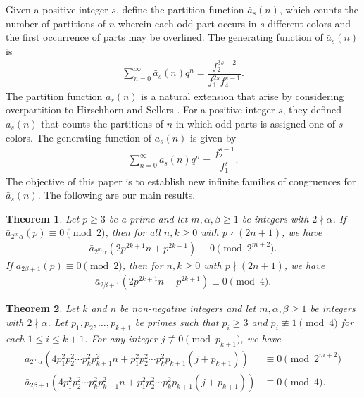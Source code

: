 \documentclass[11pt,a4paper]{article}
\numberwithin{equation}{section}
\theoremstyle{plain}
\newtheorem{theorem}{Theorem}[section]
\begin{document}
	\indent Given a positive integer $s$, define the partition function $\bar{a}_s(n)$, which counts the number of partitions of $n$ wherein each odd part occurs in $s$ different colors and the first occurrence of parts may be overlined. The generating function of $\bar{a}_s(n)$ is
	\begin{align}\label{gf}
		\sum_{n=0}^{\infty}\bar{a}_s(n)q^n=\dfrac{f_2^{3s-2}}{f_1^{2s}f_4^{s-1}}.
	\end{align}
	The partition function  $\bar{a}_{s}(n)$ is a natural extension that arise by considering overpartition to Hirschhorn and Sellers \cite{hirsch}. For a positive integer $s$, they defined $a_s(n)$ that counts the partitions of $n$ in which odd parts is assigned one of $s$ colors. The generating function of $a_s(n)$ is given by
	\begin{align}\label{e1a}
		\sum_{n=0}^{\infty}a_s(n)q^n=\dfrac{f_2^{s-1}}{f_1^s}.\end{align}
	The objective of this paper is to establish new infinite families of congruences for $\bar{a}_{s}(n)$. The following are our main results.
	\begin{theorem}\label{t2n1}
	Let $p\ge 3$ be a prime and let $m,\alpha,\beta \ge1$ be integers with $2\nmid \alpha$. If $\bar{a}_{2^m\alpha}(p)\equiv 0\pmod 2$, then for all $n,k\ge 0$ with $p\nmid(2n+1)$, we have
	\begin{align*}
	\bar{a}_{2^m\alpha}\left(2p^{2k+1}n+p^{2k+1}\right)\equiv 0\pmod {2^{m+2}}.
	\end{align*}
	If $\bar{a}_{2\beta+1}(p)\equiv 0\pmod 2$, then for $n,k\ge 0$ with $p\nmid(2n+1)$, we have
	\begin{align*}
		\bar{a}_{2\beta+1}\left(2p^{2k+1}n+p^{2k+1}\right)\equiv 0\pmod {4}.
	\end{align*}
	\end{theorem}
	\begin{theorem}\label{t4n1he}
	Let $k$ and $n$ be non-negative integers and let $m, \alpha,\beta\ge 1$ be integers with $2\nmid\alpha$. Let $p_1, p_2,\dots,p_{k+1}$ be primes such that $p_i\ge 3$ and $p_i\not\equiv1\pmod 4$ for each $1\le i\le k+1$. For any integer $j\not\equiv 0\pmod{p_{k+1}}$, we have
	\begin{align*}
	\bar{a}_{2^m\alpha}\left(4p_1^2p_2^2\cdots p_k^2p_{k+1}^2n+p_1^2p_2^2\cdots p_k^2p_{k+1}\left(j+p_{k+1}\right)\right)&\equiv 0\pmod {2^{m+2}}\\
	\bar{a}_{2\beta+1}\left(4p_1^2p_2^2\cdots p_k^2p_{k+1}^2n+p_1^2p_2^2\cdots p_k^2p_{k+1}\left(j+p_{k+1}\right)\right)&\equiv 0\pmod {4}.
	\end{align*}
	\end{theorem}
\end{document}
